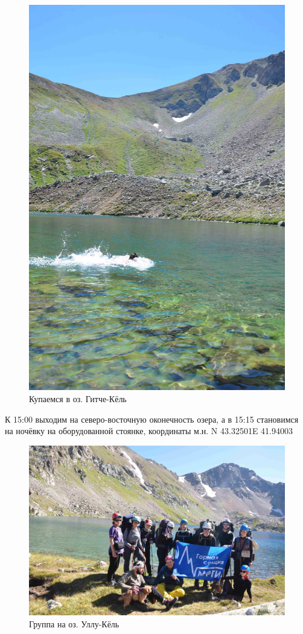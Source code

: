 \begin{figure}[h!]
	\centering
	\begin{turn}{0}
		\includegraphics[width=0.7\linewidth]{../pics/DSC_0774}
	\end{turn}
	\caption{Купаемся в оз. Гитче-Кёль}
	\label{fig:DSC_0774}
\end{figure}

К 15:00 выходим на северо-восточную оконечность озера, а в 15:15 становимся на ночёвку на оборудованной стоянке, координаты м.н. N 43.32501\degree E 41.94003\degree

\begin{figure}[h!]
	\centering
	\includegraphics[width=0.7\linewidth]{../pics/DSC_0800}
	\caption{Группа на оз. Уллу-Кёль}
	\label{fig:DSC_0800}
\end{figure}


